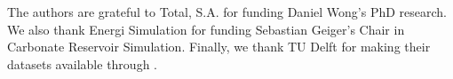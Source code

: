 \documentclass[draft]{agujournal2018}
\begin{document}
%
%
%
%
%
%
%
%


\acknowledgments
The authors are grateful to Total, S.A. for funding Daniel Wong's PhD research. We also thank Energi Simulation for funding Sebastian Geiger's Chair in Carbonate Reservoir Simulation. Finally, we thank TU Delft for making their datasets available through \citet{Bisdom2017}.



%
% 
%





\end{document}
